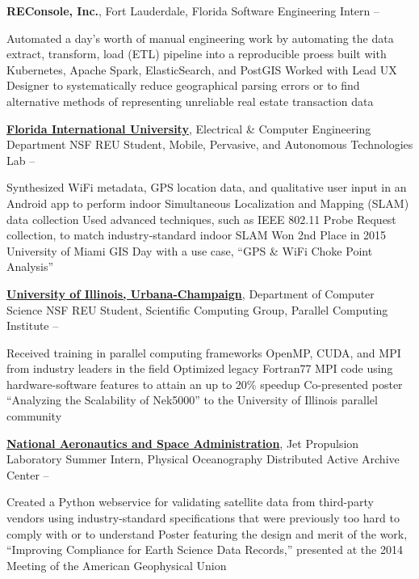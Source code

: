 \documentclass[letterpaper,MMMyyyy,nonstopmode]{simpleresumecv}
\begin{document}
\begin{Body}
\Entry
\textbf{REConsole, Inc.}, Fort Lauderdale, Florida
\Gap
\BulletItem
Software Engineering Intern
\hfill
{} -- 
\begin{Detail}
\SubBulletItem Automated a day's worth of manual engineering work by automating the data extract, transform, load (ETL) pipeline into a reproducible proess built with Kubernetes, Apache Spark, ElasticSearch, and PostGIS
\SubBulletItem Worked with Lead UX Designer to systematically reduce geographical parsing errors or to find alternative methods of representing unreliable real estate transaction data
\end{Detail}

\Entry
\href{http://www.fiu.edu/}{\textbf{Florida International University}}, Electrical \& Computer Engineering Department
\Gap
\BulletItem NSF REU Student, Mobile, Pervasive, and Autonomous Technologies Lab
\hfill {} -- 
\begin{Detail}
\SubBulletItem Synthesized WiFi metadata, GPS location data, and qualitative user input in an Android app to perform indoor Simultaneous Localization and Mapping (SLAM) data collection
\SubBulletItem Used advanced techniques, such as IEEE 802.11 Probe Request collection, to match industry-standard indoor SLAM
\SubBulletItem Won 2nd Place in 2015 University of Miami GIS Day with a use case, ``GPS \& WiFi Choke Point Analysis''
\end{Detail}

\Entry
\href{http://illinois.edu/}{\textbf{University of Illinois, Urbana-Champaign}}, Department of Computer Science
\Gap
\BulletItem NSF REU Student, Scientific Computing Group, Parallel Computing Institute
\hfill {} -- 
\begin{Detail}
\SubBulletItem Received training in parallel computing frameworks OpenMP, CUDA, and MPI from industry leaders in the field
\SubBulletItem Optimized legacy Fortran77 MPI code using hardware-software features to attain an up to 20\% speedup
\SubBulletItem Co-presented poster ``Analyzing the Scalability of Nek5000'' to the University of Illinois parallel community
\end{Detail}

\Entry
\href{http://www.jpl.nasa.gov/}{\textbf{National Aeronautics and Space Administration}}, Jet Propulsion Laboratory
\Gap
\BulletItem Summer Intern, Physical Oceanography Distributed Active Archive Center
\hfill
{} -- 
\begin{Detail}
\SubBulletItem Created a Python webservice for validating satellite data from third-party vendors using industry-standard specifications that were previously too hard to comply with or to understand
\SubBulletItem Poster featuring the design and merit of the work, ``Improving Compliance for Earth Science Data Records,'' presented at the 2014 Meeting of the American Geophysical Union
\end{Detail}


\end{Body}
\end{document}
